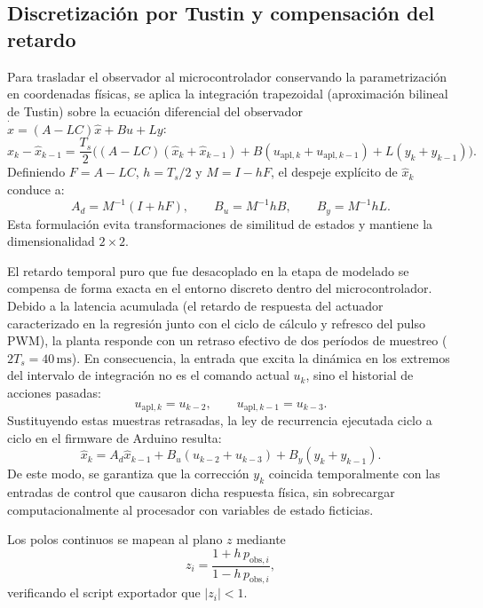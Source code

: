 \documentclass[a4paper, twoside, 10pt, spanish]{article}
\numberwithin{table}{section}
\begin{document}
\subsection{Discretización por Tustin y compensación del retardo}
Para trasladar el observador al microcontrolador conservando la parametrización en coordenadas físicas, se aplica la integración trapezoidal (aproximación bilineal de Tustin) sobre la ecuación diferencial del observador $\dot{\hat x} = (A - LC)\hat x + Bu + Ly$:
\begin{equation}
\hat x_k - \hat x_{k-1} = \frac{T_s}{2}\Big( (A - LC)(\hat x_k + \hat x_{k-1}) + B(u_{\mathrm{apl},k} + u_{\mathrm{apl},k-1}) + L(y_k + y_{k-1}) \Big).
\end{equation}
Definiendo $F = A - LC$, $h = T_s/2$ y $M = I - hF$, el despeje explícito de $\hat x_k$ conduce a:
\begin{equation}
A_d = M^{-1}(I + hF), \qquad B_u = M^{-1}hB, \qquad B_y = M^{-1}hL.
\end{equation}
Esta formulación evita transformaciones de similitud de estados y mantiene la dimensionalidad $2 \times 2$.

El retardo temporal puro que fue desacoplado en la etapa de modelado se compensa de forma exacta en el entorno discreto dentro del microcontrolador. Debido a la latencia acumulada (el retardo de respuesta del actuador caracterizado en la regresión junto con el ciclo de cálculo y refresco del pulso PWM), la planta responde con un retraso efectivo de dos períodos de muestreo ($2T_s = 40\,\mathrm{ms}$). En consecuencia, la entrada que excita la dinámica en los extremos del intervalo de integración no es el comando actual $u_k$, sino el historial de acciones pasadas:
\begin{equation}
u_{\mathrm{apl},k} = u_{k-2}, \qquad u_{\mathrm{apl},k-1} = u_{k-3}.
\end{equation}
Sustituyendo estas muestras retrasadas, la ley de recurrencia ejecutada ciclo a ciclo en el firmware de Arduino resulta:
\begin{equation}
\hat x_k = A_d \hat x_{k-1} + B_u (u_{k-2} + u_{k-3}) + B_y (y_k + y_{k-1}).
\end{equation}
De este modo, se garantiza que la corrección $y_k$ coincida temporalmente con las entradas de control que causaron dicha respuesta física, sin sobrecargar computacionalmente al procesador con variables de estado ficticias. 

Los polos continuos se mapean al plano $z$ mediante
\begin{equation}
z_i = \frac{1 + h\,p_{\mathrm{obs},i}}{1 - h\,p_{\mathrm{obs},i}},
\end{equation}
verificando el script exportador que $|z_i| < 1$.
\end{document}
